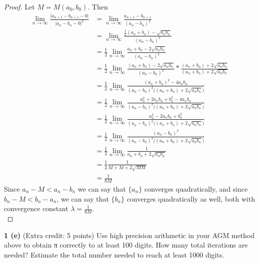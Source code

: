 \documentclass[12pt]{article}
\begin{document}
\begin{proof}
		Let $M = M(a_{0}, b_{0})$. Then \\
		\begin{align*}
			\lim\limits_{n \to \infty} \frac{\vert a_{n+1} - b_{n+1} - 0\vert}{ \vert a_n - b_n - 0 \vert ^ 2} & = \lim\limits_{n \to \infty} \frac{a_{n+1}-b_{n+1}}{(a_n -b_n) ^ 2} \\
			& = \lim\limits_{n \to \infty} \frac{ \frac{1}{2}(a_n+b_n) - \sqrt{a_nb_n}}{(a_n -b_n) ^ 2} \\
			& = \frac{1}{2} \lim\limits_{n \to \infty} \frac{a_n + b_n - 2\sqrt{a_nb_n}}{(a_n -b_n) ^ 2} \\
			& = \frac{1}{2} \lim\limits_{n \to \infty} \frac{(a_n + b_n) - 2\sqrt{a_nb_n}}{(a_n -b_n) ^ 2} * \frac{(a_n + b_n) + 2\sqrt{a_nb_n}}{(a_n + b_n) + 2\sqrt{a_nb_n}}\\
			& = \frac{1}{2} \lim\limits_{n \to \infty} \frac{(a_n + b_n)^2 - 4a_nb_n}{(a_n -b_n) ^ 2 \big( (a_n + b_n) + 2\sqrt{a_nb_n} \big) } \\
			& = \frac{1}{2} \lim\limits_{n \to \infty} \frac{a_n^2 + 2a_nb_n + b_n^2 - 4a_nb_n}{(a_n -b_n) ^ 2 \big( (a_n + b_n) + 2\sqrt{a_nb_n} \big) } \\
			& = \frac{1}{2} \lim\limits_{n \to \infty} \frac{a_n^2 - 2a_nb_n + b_n^2}{(a_n -b_n) ^ 2 \big( (a_n + b_n) + 2\sqrt{a_nb_n} \big) } \\
			& = \frac{1}{2} \lim\limits_{n \to \infty} \frac{(a_n -b_n) ^ 2}{(a_n -b_n) ^ 2 \big( (a_n + b_n) + 2\sqrt{a_nb_n} \big) } \\
			& = \frac{1}{2} \lim\limits_{n \to \infty} \frac{1}{ a_n + b_n + 2\sqrt{a_nb_n} } \\
			& = \frac{1}{2} \frac{1}{ M + M + 2\sqrt{MM} } \\
			& = \frac{1}{8M}
		\end{align*}
		Since $ a_n - M < a_n - b_n$ we can say that $\{a_n\}$ converges quadratically, and since $b_n - M < b_n - a_n$, we can say that $\{b_n\}$ converges quadratically as well, both with convergence constant $\lambda = \frac{1}{8M}$. \\
	\end{proof}
	
	\bigbreak
	
\hspace{-7 ex}\textbf{1 (e)} (Extra credit: 5 points) Use high precision arithmetic in your AGM method above to obtain π correctly to at least 100 digits. How many total iterations are needed? Estimate the total number needed to reach at least 1000 digits. \bigbreak
\end{document}
